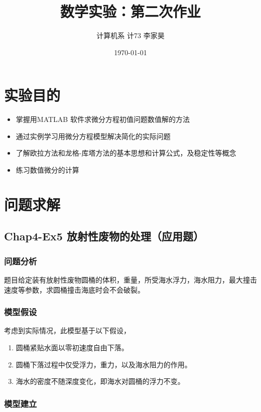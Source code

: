\documentclass[12pt,a4paper]{article}
\title{数学实验：第二次作业}
\author{计算机系 \quad 计73 \quad 2017011620 \quad 李家昊}
\date{\today}
\begin{document}
\maketitle

\section{实验目的}

\begin{itemize}
    \item 掌握用MATLAB 软件求微分方程初值问题数值解的方法
    \item 通过实例学习用微分方程模型解决简化的实际问题
    \item 了解欧拉方法和龙格-库塔方法的基本思想和计算公式，及稳定性等概念
    \item 练习数值微分的计算
\end{itemize}

\section{问题求解}

\subsection{Chap4-Ex5 放射性废物的处理（应用题）}

\subsubsection{问题分析}

题目给定装有放射性废物圆桶的体积，重量，所受海水浮力，海水阻力，最大撞击速度等参数，求圆桶撞击海底时会不会破裂。

\subsubsection{模型假设}

考虑到实际情况，此模型基于以下假设，
\begin{enumerate}[1.]
    \item 圆桶紧贴水面以零初速度自由下落。
    \item 圆桶下落过程中仅受浮力，重力，以及海水阻力的作用。
    \item 海水的密度不随深度变化，即海水对圆桶的浮力不变。
\end{enumerate}

\subsubsection{模型建立}
\end{document}
